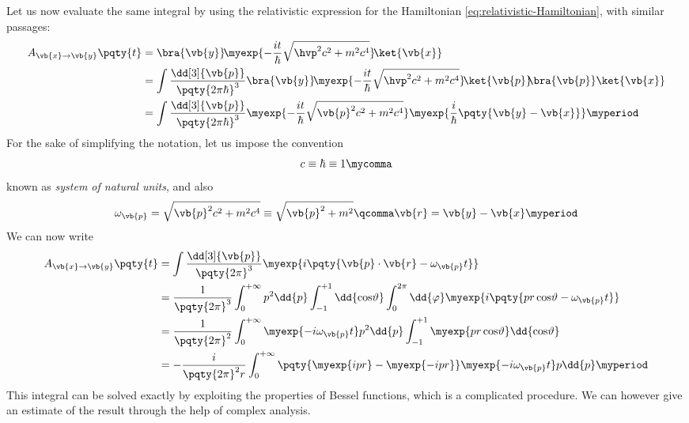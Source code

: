             Let us now evaluate the same integral by using the relativistic expression for the Hamiltonian \eqref{eq:relativistic-Hamiltonian}, with similar passages:
            \begin{align*}
                A_{\vb{x} \to \vb{y}}\pqty{t}
                &= \bra{\vb{y}}\! \myexp{-\frac{it}{\hbar} \sqrt{\hvp^2 c^2 + m^2 c^4}} \!\ket{\vb{x}} \\
                &= \int\nolimits \frac{\dd[3]{\vb{p}}}{\pqty{2 \pi \hbar}^3} \bra{\vb{y}}\! \myexp{-\frac{it}{\hbar} \sqrt{\hvp^2 c^2 + m^2 c^4}} \!\ket{\vb{p}}\! \!\bra{\vb{p}}\ket{\vb{x}} \\
                &= \int\nolimits \frac{\dd[3]{\vb{p}}}{\pqty{2 \pi \hbar}^3} \myexp{-\frac{it}{\hbar} \sqrt{\vb{p}^2 c^2 + m^2 c^4}} \myexp{\frac{i}{\hbar} \pqty{\vb{y} - \vb{x}}}
                \myperiod
            \end{align*}
            For the sake of simplifying the notation, let us impose the convention
            \begin{equation}
                \label{eq:natural-units}
                c \equiv \hbar \equiv 1
                \mycomma
            \end{equation}
            known as \emph{system of natural units}, and also
            \begin{equation*}
                \omega_{\vb{p}} = \sqrt{\vb{p}^2 c^2 + m^2 c^4} \equiv \sqrt{\vb{p}^2 + m^2}\qcomma \vb{r} = \vb{y} - \vb{x}
                \myperiod
            \end{equation*}
            We can now write
            \begin{align*}
                A_{\vb{x} \to \vb{y}}\pqty{t}
                &= \int\nolimits \frac{\dd[3]{\vb{p}}}{\pqty{2 \pi}^3} \myexp{i \pqty{\vb{p} \cdot \vb{r} - \omega_{\vb{p}}t}} \\
                &= \frac{1}{\pqty{2\pi}^3}\int_{0}^{+\infty} p^2\dd{p} \int_{-1}^{+1} \dd{\cos\!\vartheta} \int_{0}^{2\pi} \dd{\varphi} \myexp{i\pqty{p r \cos\!\vartheta - \omega_{\vb{p}}t}} \\
                &= \frac{1}{\pqty{2 \pi}^2} \int_{0}^{+\infty} \myexp{-i\omega_{\vb{p}}t} p^2 \dd{p} \int_{-1}^{+1} \myexp{p r \cos\!\vartheta} \dd{\cos\!\vartheta} \\
                &= -\frac{i}{\pqty{2 \pi}^2 r} \int_{0}^{+\infty} \pqty{\myexp{i p r} - \myexp{-i p r}} \myexp{-i\omega_{\vb{p}}t} p \dd{p}
                \myperiod
            \end{align*}
            This integral can be solved exactly by exploiting the properties of Bessel functions, which is a complicated procedure. We can however give an estimate of the result through the help of complex analysis.
